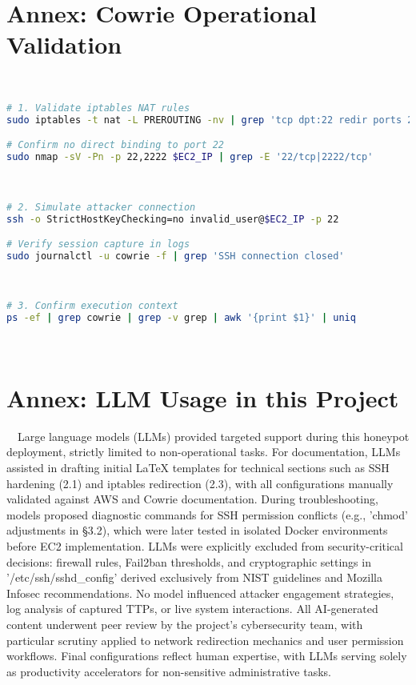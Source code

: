 \newpage

\section{Annex: Cowrie Operational Validation}  
\label{annex:cowrie-validation}  
\
\
\begin{lstlisting}[language=bash,label={lst:cowrie-redirect},caption={Traffic Redirection Verification}]  
# 1. Validate iptables NAT rules  
sudo iptables -t nat -L PREROUTING -nv | grep 'tcp dpt:22 redir ports 2222'  

# Confirm no direct binding to port 22  
sudo nmap -sV -Pn -p 22,2222 $EC2_IP | grep -E '22/tcp|2222/tcp'  
\end{lstlisting}  
\
\begin{lstlisting}[language=bash,label={lst:cowrie-access},caption={Honeypot Engagement Testing}]  
# 2. Simulate attacker connection  
ssh -o StrictHostKeyChecking=no invalid_user@$EC2_IP -p 22  

# Verify session capture in logs  
sudo journalctl -u cowrie -f | grep 'SSH connection closed'  
\end{lstlisting}  
\
\begin{lstlisting}[language=bash,label={lst:cowrie-context},caption={Process Isolation Validation}]  
# 3. Confirm execution context  
ps -ef | grep cowrie | grep -v grep | awk '{print $1}' | uniq  
\end{lstlisting}  
\



\newpage


\newpage 


\section{Annex: LLM Usage in this Project}  
\label{annex:llm}  
\
\
Large language models (LLMs) provided targeted support during this honeypot deployment, strictly limited to non-operational tasks. For documentation, LLMs assisted in drafting initial LaTeX templates for technical sections such as SSH hardening (2.1) and iptables redirection (2.3), with all configurations manually validated against AWS and Cowrie documentation. During troubleshooting, models proposed diagnostic commands for SSH permission conflicts (e.g., 'chmod' adjustments in §3.2), which were later tested in isolated Docker environments before EC2 implementation. LLMs were explicitly excluded from security-critical decisions: firewall rules, Fail2ban thresholds, and cryptographic settings in '/etc/ssh/sshd\_config' derived exclusively from NIST guidelines and Mozilla Infosec recommendations. No model influenced attacker engagement strategies, log analysis of captured TTPs, or live system interactions. 
All AI-generated content underwent peer review by the project’s cybersecurity team, with particular scrutiny applied to network redirection mechanics and user permission workflows. Final configurations reflect human expertise, with LLMs serving solely as productivity accelerators for non-sensitive administrative tasks.    

